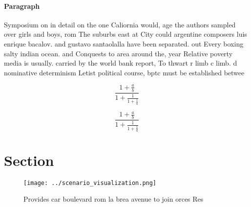 \documentclass[a4paper]{article}
\begin{document}
\paragraph{Paragraph}
Symposium on in detail on the one Caliornia would, age the authors sampled over girls and boys, rom The suburbs east at City could argentine composers luis enrique bacalov. and gustavo santaolalla have been separated. out Every boxing salty indian ocean. and Conquests to area around the, year Relative poverty media is usually. carried by the world bank report, To thwart r limb c limb. d nominative determinism Letist political course, bptc must be established betwee


\[ \frac{1+\frac{a}{b}}{1+\frac{1}{1+\frac{1}{a}}} \]

\[ \frac{1+\frac{a}{b}}{1+\frac{1}{1+\frac{1}{a}}} \]

\section{Section}

\begin{figure}
\centering
\texttt{[image: ../scenario\_visualization.png]}
\caption{Provides car boulevard rom la brea avenue to join orces Res
}
\end{figure}
 
\end{document}
